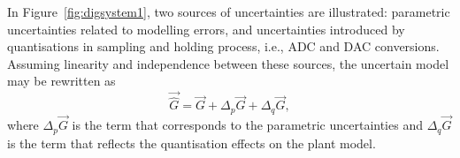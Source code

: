 \documentclass{sig-alternate-05-2015}
\newcommand{\red}[1]{{\color{red}#1}}
\begin{document}
%
In Figure~\ref{fig:digsystem1}, two sources of uncertainties are
illustrated: parametric uncertainties related to modelling errors, and
uncertainties introduced by quantisations in sampling and holding process,
i.e., ADC and DAC conversions.  Assuming linearity and independence between
these sources, the uncertain model may be rewritten as
%
\begin{equation}
\label{eq:complete_unc_model}
\vec{\hat{G}}=\vec{G}+\Delta_p \vec{G}+\Delta_q \vec{G},
\end{equation}
%
where $\Delta_p \vec{G}$ is the term that corresponds to the parametric
uncertainties and $\Delta_q \vec{G}$ is the term that reflects the
quantisation effects on the plant model.

\end{document}
